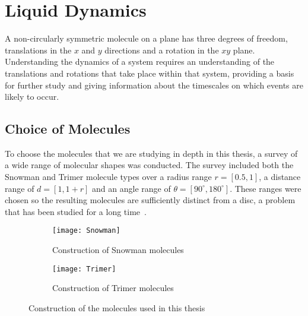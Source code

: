 \chapter{Liquid Dynamics}

A non-circularly symmetric molecule on a plane has three degrees of freedom, translations in the $x$ and $y$ directions and a rotation in the $xy$ plane. Understanding the dynamics of a system requires an understanding of the translations and rotations that take place within that system, providing a basis for further study and giving information about the timescales on which events are likely to occur.

\section{Choice of Molecules}

To choose the molecules that we are studying in depth in this thesis, a survey of a wide range of molecular shapes was conducted. The survey included both the Snowman and Trimer molecule types over a radius range $r = [0.5,1]$, a distance range of $d = [1,1+r]$ and an angle range of $\theta = [90^\circ,180^\circ]$. These ranges were chosen so the resulting molecules are sufficiently distinct from a disc, a problem that has been studied for a long time~\cite{verlet:67}.

\begin{figure}
    \begin{subfigure}{0.5\textwidth}
        \centering
        \texttt{[image: Snowman]}
        \caption{Construction of Snowman molecules}
        \label{fig:snowman}
    \end{subfigure}
    \begin{subfigure}{0.5\textwidth}
        \centering
        \texttt{[image: Trimer]}
        \caption{Construction of Trimer molecules}
        \label{fig:trimer}
    \end{subfigure}
    \caption{Construction of the molecules used in this thesis}
    \label{fig:construction}
\end{figure}

